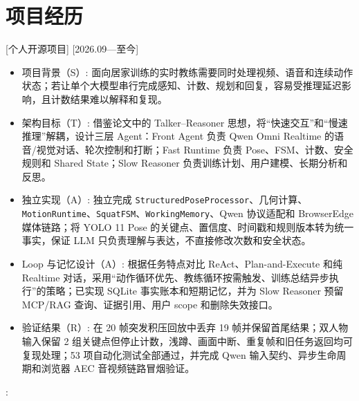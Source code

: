 \documentclass{resume}
\begin{document}
\section{项目经历}
[个人开源项目]
[2026.09—至今]

\begin{itemize}[leftmargin=0pt,label={},labelsep=0pt,itemindent=0pt]
  \item[] {\heiti 项目背景（S）}: 面向居家训练的实时教练需要同时处理视频、语音和连续动作状态；若让单个大模型串行完成感知、计数、规划和回复，容易受推理延迟影响，且计数结果难以解释和复现。
  \item[] {\heiti 架构目标（T）}: 借鉴论文中的 Talker--Reasoner 思想，将“快速交互”和“慢速推理”解耦，设计三层 Agent：Front Agent 负责 Qwen Omni Realtime 的语音/视觉对话、轮次控制和打断；Fast Runtime 负责 Pose、FSM、计数、安全规则和 Shared State；Slow Reasoner 负责训练计划、用户建模、长期分析和反思。
  \item[] {\heiti 独立实现（A）}: 独立完成 \texttt{StructuredPoseProcessor}、几何计算、\texttt{MotionRuntime}、\texttt{SquatFSM}、\texttt{WorkingMemory}、Qwen 协议适配和 BrowserEdge 媒体链路；将 YOLO 11 Pose 的关键点、置信度、时间戳和规则版本转为统一事实，保证 LLM 只负责理解与表达，不直接修改次数和安全状态。
  \item[] {\heiti Loop 与记忆设计（A）}: 根据任务特点对比 ReAct、Plan-and-Execute 和纯 Realtime 对话，采用“动作循环优先、教练循环按需触发、训练总结异步执行”的策略；已实现 SQLite 事实账本和短期记忆，并为 Slow Reasoner 预留 MCP/RAG 查询、证据引用、用户 scope 和删除失效接口。
  \item[] {\heiti 验证结果（R）}: 在 20 帧突发积压回放中丢弃 19 帧并保留首尾结果；双人物输入保留 2 组关键点但停止计数，浅蹲、画面中断、重复帧和旧任务返回均可复现处理；53 项自动化测试全部通过，并完成 Qwen 输入契约、异步生命周期和浏览器 AEC 音视频链路冒烟验证。
\end{itemize}

: 
\end{document}
